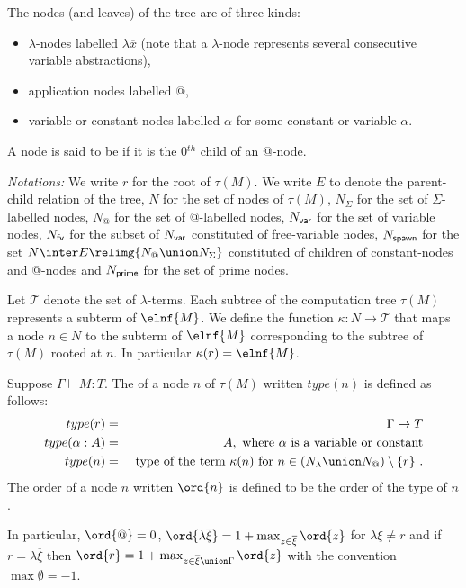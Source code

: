 The nodes (and leaves) of the tree are of three kinds:
\begin{itemize}
\item $\lambda$-nodes labelled $\lambda \overline{x}$ (note that a $\lambda$-node represents several consecutive variable abstractions),
\item application nodes labelled @,
\item variable or constant nodes labelled $\alpha$ for some constant or variable $\alpha$.
\end{itemize}
A node is said to be  if it is the 0$^{th}$ child of an @-node.

\emph{Notations:} We write $r$ for the root of $\tau(M)$. We write $E$ to denote the parent-child relation
of the tree, $N$ for the set of nodes of $\tau(M)$,
$N_\Sigma$ for the set of $\Sigma$-labelled nodes, $N_@$ for the set
of @-labelled nodes, $N_{\sf var}$ for the set of variable nodes,
$N_{\sf fv}$ for the subset of $N_{\sf var}$ constituted of free-variable
nodes, $N_{\sf spawn}$ for the set $N \inter E \relimg{N_@ \union N_\Sigma}$ constituted of children of constant-nodes and @-nodes and $N_{\sf prime}$ for the set of prime nodes.


Let $\mathcal{T}$ denote the set of $\lambda$-terms.
Each subtree of the computation tree $\tau(M)$ represents a subterm of $\elnf{M}$.
We define the function $\kappa : N \rightarrow \mathcal{T}$ that maps a node $n \in N$ to the subterm of $\elnf{M}$
corresponding to the subtree of $\tau(M)$ rooted at $n$.
In particular $\kappa(r) = \elnf{M}$.

\begin{definition}
\label{def:nodeorder}
Suppose $\Gamma \vdash M : T$.
The  of a node $n$ of $\tau(M)$ written $type(n)$ is defined as follows:
\begin{eqnarray*}
type(r) &=& \Gamma \rightarrow T \\
type(\alpha:A) &=& A, \mbox{ where $\alpha$ is a variable or constant} \\
type(n) &=& \hbox{ type of the term $\kappa(n)$ for $n \in (N_\lambda \union N_@) \setminus \{r \}$\ .}
\end{eqnarray*}
The order of a node $n$ written $\ord{n}$ is defined to be the order of the type of $n$.
\end{definition}

In particular, $\ord{@} = 0$, $\ord{\lambda \overline{\xi}} = 1+
\max_{z\in \overline{\xi}} \ord{z}$ for $\lambda \overline{\xi}\neq
r$ and if $r=\lambda \overline{\xi}$ then $\ord{r} = 1 + \max_{z\in
\overline{\xi}\union \Gamma} \ord{z}$ with the convention $\max
\emptyset = -1$.

